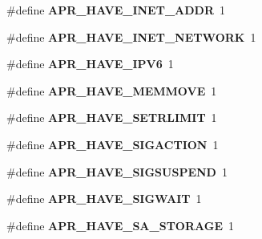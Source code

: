 \begin{DoxyCompactItemize}
\item 
\#define {\bfseries A\+P\+R\+\_\+\+H\+A\+V\+E\+\_\+\+I\+N\+E\+T\+\_\+\+A\+D\+DR}~1\hypertarget{group__apr__platform_ga0c38cccb121e483045a2564bb1ae61ec}{}\label{group__apr__platform_ga0c38cccb121e483045a2564bb1ae61ec}

\item 
\#define {\bfseries A\+P\+R\+\_\+\+H\+A\+V\+E\+\_\+\+I\+N\+E\+T\+\_\+\+N\+E\+T\+W\+O\+RK}~1\hypertarget{group__apr__platform_gaadacfca3c1cbae0447c1b4d4ea499d57}{}\label{group__apr__platform_gaadacfca3c1cbae0447c1b4d4ea499d57}

\item 
\#define {\bfseries A\+P\+R\+\_\+\+H\+A\+V\+E\+\_\+\+I\+P\+V6}~1\hypertarget{group__apr__platform_gab42a2abcd9e58a79b4bf40e8f02e57a2}{}\label{group__apr__platform_gab42a2abcd9e58a79b4bf40e8f02e57a2}

\item 
\#define {\bfseries A\+P\+R\+\_\+\+H\+A\+V\+E\+\_\+\+M\+E\+M\+M\+O\+VE}~1\hypertarget{group__apr__platform_ga0aff7b8d78dc6cea94892a3738bc0edf}{}\label{group__apr__platform_ga0aff7b8d78dc6cea94892a3738bc0edf}

\item 
\#define {\bfseries A\+P\+R\+\_\+\+H\+A\+V\+E\+\_\+\+S\+E\+T\+R\+L\+I\+M\+IT}~1\hypertarget{group__apr__platform_ga4a858c53da127087a9bef6105531ce54}{}\label{group__apr__platform_ga4a858c53da127087a9bef6105531ce54}

\item 
\#define {\bfseries A\+P\+R\+\_\+\+H\+A\+V\+E\+\_\+\+S\+I\+G\+A\+C\+T\+I\+ON}~1\hypertarget{group__apr__platform_ga2ed59eb76fdfc4d332a1ef5583206f05}{}\label{group__apr__platform_ga2ed59eb76fdfc4d332a1ef5583206f05}

\item 
\#define {\bfseries A\+P\+R\+\_\+\+H\+A\+V\+E\+\_\+\+S\+I\+G\+S\+U\+S\+P\+E\+ND}~1\hypertarget{group__apr__platform_ga661ccf871e31f9e8e4adc75dbfd67951}{}\label{group__apr__platform_ga661ccf871e31f9e8e4adc75dbfd67951}

\item 
\#define {\bfseries A\+P\+R\+\_\+\+H\+A\+V\+E\+\_\+\+S\+I\+G\+W\+A\+IT}~1\hypertarget{group__apr__platform_ga0117237934a6095a050a9d39ff152a26}{}\label{group__apr__platform_ga0117237934a6095a050a9d39ff152a26}

\item 
\#define {\bfseries A\+P\+R\+\_\+\+H\+A\+V\+E\+\_\+\+S\+A\+\_\+\+S\+T\+O\+R\+A\+GE}~1\hypertarget{group__apr__platform_ga57c4c6c8a22aeef21db29093f2f648f9}{}\label{group__apr__platform_ga57c4c6c8a22aeef21db29093f2f648f9}


\end{DoxyCompactItemize}
